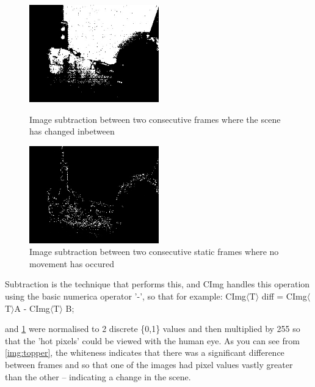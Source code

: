\documentclass[11pt]{article} %
\begin{document}
{{\subsubsection*{}
\begin{figure}
	\vspace{-40pt}
	\begin{center}
		\includegraphics[width=0.5\textwidth]{../images/subG}
	\end{center}
	\vspace{-20pt}
	\caption{Image subtraction between two consecutive frames where the scene has changed inbetween}\label{img:topper}
	\vspace{10pt}
	\begin{center}
		\includegraphics[width=0.5\textwidth]{../images/subF}
	\end{center}
	\vspace{-20pt}
	\caption{Image subtraction between two consecutive static frames where no movement has occured}\label{img:botter}
	\vspace{-10pt}
\end{figure}
Subtraction is the technique that performs this, and CImg handles this operation using the basic numerica operator '-', so that for example: CImg\(\langle\)T\(\rangle\) diff = CImg\(\langle\)T\(\rangle\)A - CImg\(\langle\)T\(\rangle\) B;

 and \cref{img:botter} were normalised to 2 discrete \{0,1\} values and then multiplied by 255 so that the 'hot pixels' could be viewed with the human eye. As you can see from \cref{img:topper}, the whiteness indicates that there was a significant difference between frames and so that one of the images had pixel values vastly greater than the other -- indicating a change in the scene.

}}
\end{document}
